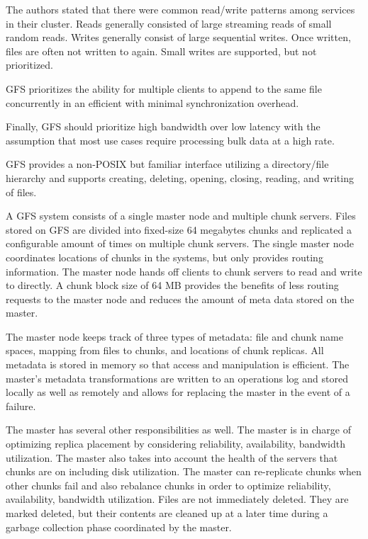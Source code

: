 \documentclass[]{article}
\begin{document}
The authors stated that there were common read/write patterns among services in their cluster. Reads generally consisted of large streaming reads of small random reads. Writes generally consist of large sequential writes. Once written, files are often not written to again. Small writes are supported, but not prioritized. 

GFS prioritizes the ability for multiple clients to append to the same file concurrently in an efficient with minimal synchronization overhead.

Finally, GFS should prioritize high bandwidth over low latency with the assumption that most use cases require processing bulk data at a high rate.

GFS provides a non-POSIX but familiar interface utilizing a directory/file hierarchy and supports creating, deleting, opening, closing, reading, and writing of files.

A GFS system consists of a single master node and multiple chunk servers. Files stored on GFS are divided into fixed-size 64 megabytes chunks and replicated a configurable amount of times on multiple chunk servers. The single master node coordinates locations of chunks in the systems, but only provides routing information. The master node hands off clients to chunk servers to read and write to directly. A chunk block size of 64 MB provides the benefits of less routing requests to the master node and reduces the amount of meta data stored on the master.

The master node keeps track of three types of metadata: file and chunk name spaces, mapping from files to chunks, and locations of chunk replicas. All metadata is stored in memory so that access and manipulation is efficient. The master's metadata transformations are written to an operations log and stored locally as well as remotely and allows for replacing the master in the event of a failure.

The master has several other responsibilities as well. The master is in charge of optimizing replica placement by considering reliability, availability, bandwidth utilization. The master also takes into account the health of the servers that chunks are on including disk utilization. The master can re-replicate chunks when other chunks fail and also rebalance chunks in order to optimize reliability, availability, bandwidth utilization. Files are not immediately deleted. They are marked deleted, but their contents are cleaned up at a later time during a garbage collection phase coordinated by the master.
\end{document}

